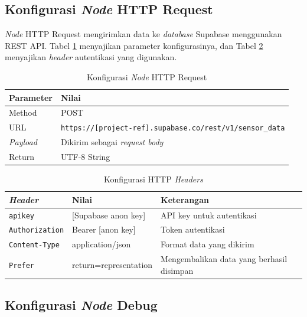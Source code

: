 \subsection{Konfigurasi \textit{Node} HTTP Request}

\textit{Node} HTTP Request mengirimkan data ke \textit{database} Supabase menggunakan REST API. Tabel \ref{tab:konfigurasi-http} menyajikan parameter konfigurasinya, dan Tabel \ref{tab:konfigurasi-headers} menyajikan \textit{header} autentikasi yang digunakan.

\begin{table}[H]
  \caption{Konfigurasi \textit{Node} HTTP Request}
  \label{tab:konfigurasi-http}
  \begin{tabularx}{\textwidth}{| l | X |}
    \hline
    \textbf{Parameter} & \textbf{Nilai} \\
    \hline
    Method & POST \\
    \hline
    URL & \texttt{https://[project-ref]\allowbreak.supabase.co\allowbreak/rest\allowbreak/v1\allowbreak/sensor\_data} \\
    \hline
    \textit{Payload} & Dikirim sebagai \textit{request body} \\
    \hline
    Return & UTF-8 String \\
    \hline
  \end{tabularx}
\end{table}

\begin{table}[H]
  \caption{Konfigurasi HTTP \textit{Headers}}
  \label{tab:konfigurasi-headers}
  \begin{tabularx}{\textwidth}{| l | l | X |}
    \hline
    \textbf{\textit{Header}} & \textbf{Nilai} & \textbf{Keterangan} \\
    \hline
    \texttt{apikey} & [Supabase anon key] & API key untuk autentikasi \\
    \hline
    \texttt{Authorization} & Bearer [anon key] & Token autentikasi \\
    \hline
    \texttt{Content-Type} & application/json & Format data yang dikirim \\
    \hline
    \texttt{Prefer} & return=representation & Mengembalikan data yang berhasil disimpan \\
    \hline
  \end{tabularx}
\end{table}

\subsection{Konfigurasi \textit{Node} Debug}

